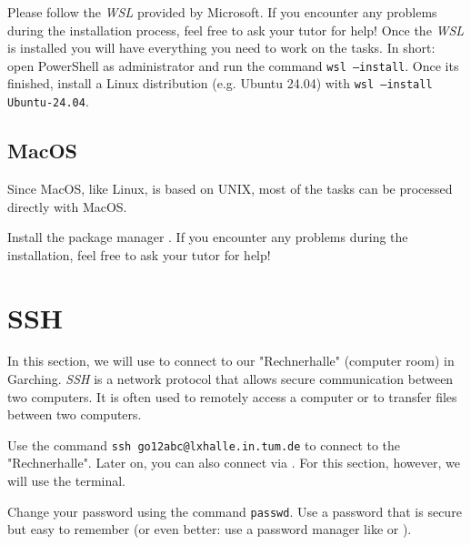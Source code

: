 \documentclass[english]{sheet}
\begin{document}
Please follow the \emph{WSL}  provided by Microsoft. If you encounter any problems during the installation process, feel free to ask your tutor for help! Once the \emph{WSL} is installed you will have everything you need to work on the tasks.
In short: open PowerShell as administrator and run the command \texttt{wsl --install}. Once its finished, install a Linux distribution (e.g. Ubuntu 24.04) with \texttt{wsl --install Ubuntu-24.04}.

\subsection{MacOS}
Since MacOS, like Linux, is based on UNIX, most of the tasks can be processed directly with MacOS.

Install the package manager . If you encounter any problems during the installation, feel free to ask your tutor for help!

\section{SSH}
In this section, we will use  to connect to our "Rechnerhalle" (computer room) in Garching. \emph{SSH} is a network protocol that allows secure communication between two computers. It is often used to remotely access a computer or to transfer files between two computers. 

\begin{exercise}[subtitle=Establishing a connection]
    Use the command \texttt{ssh go12abc@lxhalle.in.tum.de} to connect to the "Rechnerhalle".
    Later on, you can also connect via . For this section, however, we will use the terminal.
\end{exercise}

\begin{exercise}[subtitle=(*)Change password]
    Change your password using the command \texttt{passwd}. Use a password that is secure but easy to remember (or even better: use a password manager like  or ).
\end{exercise}
\end{document}
